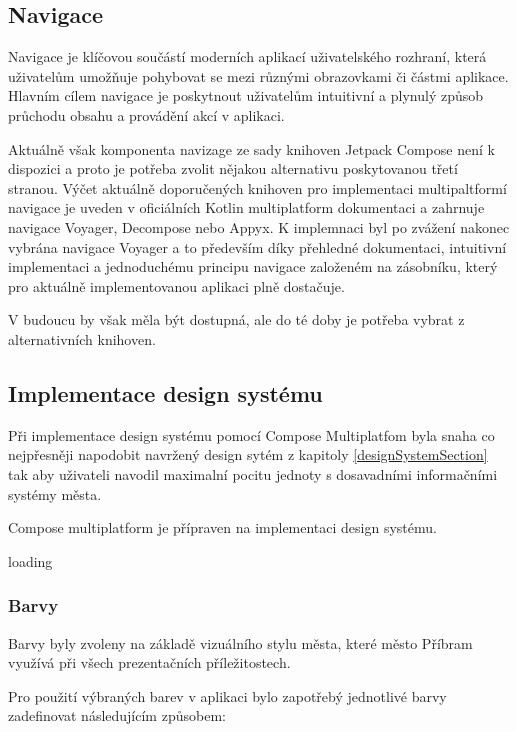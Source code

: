\subsection{Navigace}
Navigace je klíčovou součástí moderních aplikací uživatelského rozhraní, která uživatelům umožňuje pohybovat se mezi různými obrazovkami či 
částmi aplikace. Hlavním cílem navigace je poskytnout uživatelům intuitivní a plynulý způsob průchodu obsahu a provádění akcí v aplikaci. 

Aktuálně však komponenta navizage ze sady knihoven Jetpack Compose není k dispozici a proto je potřeba zvolit nějakou alternativu poskytovanou
třetí stranou. \cite{composeNav} Výčet aktuálně doporučených knihoven pro implementaci multipaltformí navigace je uveden v oficiálních Kotlin 
multiplatform dokumentaci a zahrnuje navigace Voyager, Decompose nebo Appyx. K implemnaci byl po zvážení nakonec vybrána navigace Voyager a 
to především díky přehledné dokumentaci, intuitivní implementaci a jednoduchému principu navigace založeném na zásobníku, který pro aktuálně
implementovanou aplikaci plně dostačuje.

V budoucu by však měla být dostupná, ale do té doby je potřeba vybrat z alternativních knihoven.



\subsection{Implementace design systému}

Při implementace design systému pomocí Compose Multiplatfom byla snaha co nejpřesněji napodobit navržený design sytém z kapitoly \ref{designSystemSection}
tak aby uživateli navodil maximalní pocitu jednoty s dosavadními informačními systémy města.


Compose multiplatform je přípraven na implementaci design systému. 

loading


\subsubsection{Barvy}
Barvy byly zvoleny na základě vizuálního stylu města, které město Příbram využívá při všech prezentačních příležitostech.

Pro použití výbraných barev v aplikaci bylo zapotřebý jednotlivé barvy zadefinovat následujícím způsobem:

